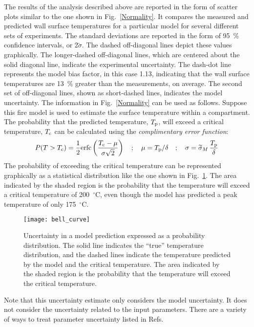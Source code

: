 \documentclass[fleqn,b5paper]{article}
\begin{document}
The results of the analysis described above are reported in the form of scatter plots similar to the one shown in Fig.~\ref{Normality}. It compares the measured and predicted wall surface temperatures for a particular model for several different sets of experiments. The standard deviations are reported in the form of 95~\% confidence intervals, or $2\widetilde{\sigma}$. The dashed off-diagonal lines depict these values graphically. The longer-dashed off-diagonal lines, which are centered about the solid diagonal line, indicate the experimental uncertainty.  The dash-dot line represents the model bias factor, in this case 1.13, indicating that the wall surface temperatures are 13~\% greater than the measurements, on average. The second set of off-diagonal lines, shown as short-dashed lines, indicates the model uncertainty. The information in Fig.~\ref{Normality} can be used as follows. Suppose this fire model is used to estimate the surface temperature within a compartment. The probability that the predicted temperature, $T_{\rm p}$, will exceed a critical temperature, $T_{\rm c}$ can be calculated using the {\em complimentary error function}:
\begin{equation}
   P(T>T_{\rm c}) = \frac{1}{2} \hbox{erfc} \left( \frac{T_{\rm c} - \mu}{\sigma \sqrt{2}} \right) \quad ; \quad \mu=T_{\rm p}/\delta \quad ; \quad \sigma = \widetilde{\sigma}_M \, \frac{T_{\rm p}}{\delta}
\end{equation}
The probability of exceeding the critical temperature can be represented graphically as a statistical distribution like the one shown in Fig.~\ref{bell_curve}. The area indicated by the shaded region is the probability that the temperature will exceed a critical temperature of 200~$^\circ$C, even though the model has predicted a peak temperature of only 175~$^\circ$C.
\begin{figure}[ht]
\begin{center}
\texttt{[image: bell\_curve]}
\end{center}
\caption[Demonstration of model uncertainty.]{Uncertainty in a model prediction expressed as a probability distribution. The solid line indicates the ``true'' temperature distribution, and the dashed lines indicate the temperature predicted by the model and the critical temperature. The area indicated by the shaded region is the probability that the temperature will exceed the critical temperature.}
\label{bell_curve}
\end{figure}
Note that this uncertainty estimate only considers the model uncertainty. It does not consider the uncertainty related to the input parameters. There are a variety of ways to treat parameter uncertainty listed in Refs.~\cite{ASTM:E1355,ISO16730,NUREG_1934,SFPE_G.06}
\end{document}
